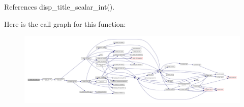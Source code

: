 References disp\+\_\+title\+\_\+scalar\+\_\+int().

Here is the call graph for this function\+:
\nopagebreak
\begin{figure}[H]
\begin{center}
\leavevmode
\includegraphics[width=350pt]{namespacem__display_adddf4774edf1fedf5b1f02f47fbbc82f_cgraph}
\end{center}
\end{figure}
\mbox{\label{namespacem__display_aca571cfcf5dcced1070969200f717a28}} 
